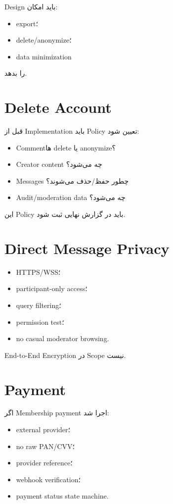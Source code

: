 Design باید امکان:
\begin{itemize}
  \item export؛
  \item delete/anonymize؛
  \item data minimization
\end{itemize}
را بدهد.

\section{Delete Account}

قبل از Implementation باید Policy تعیین شود:
\begin{itemize}
  \item Commentها delete یا anonymize؟
  \item Creator content چه می‌شود؟
  \item Messages چطور حفظ/حذف می‌شوند؟
  \item Audit/moderation data چه می‌شود؟
\end{itemize}

این Policy باید در گزارش نهایی ثبت شود.

\section{Direct Message Privacy}

\begin{itemize}
  \item HTTPS/WSS؛
  \item participant-only access؛
  \item query filtering؛
  \item permission test؛
  \item no casual moderator browsing.
\end{itemize}

End-to-End Encryption در Scope نیست.

\section{Payment}

اگر Membership payment اجرا شد:
\begin{itemize}
  \item external provider؛
  \item no raw PAN/CVV؛
  \item provider reference؛
  \item webhook verification؛
  \item payment status state machine.
\end{itemize}

